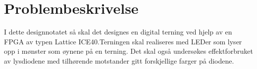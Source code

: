 \section{Problembeskrivelse}
\label{problemBeskrivelse}



I dette designnotatet så skal det designes en digital terning ved hjelp av en FPGA av typen Lattice ICE40.Terningen skal realiseres med LEDer som lyser opp i mønster som øynene på en terning. Det skal også undersøkes effektforbruket av lysdiodene med tilhørende motstander gitt forskjellige farger på diodene. 